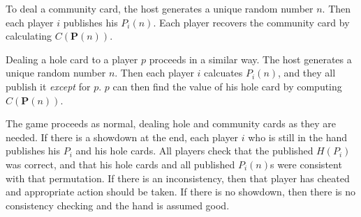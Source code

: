 \documentclass[12pt]{article}
\begin{document}
To deal a community card, the host generates a unique random number $n$.
Then each player $i$ publishes his $P_i(n)$.  Each player recovers
the community card by calculating $C(\textbf{P}(n))$.

Dealing a hole card to a player $p$ proceeds in a similar way.  The host
generates a unique random number $n$.  Then each player $i$ calcuates
$P_i(n)$, and they all publish it \textit{except} for $p$.  $p$ can then
find the value of his hole card by computing $C(\textbf{P}(n))$.

The game proceeds as normal, dealing hole and community cards as they
are needed.  If there is a showdown at the end, each player $i$ who is
still in the hand publishes his $P_i$ and his hole cards.  All players
check that the published $H(P_i)$ was correct, and that his hole cards
and all published $P_i(n)$s were consistent with that permutation.  If
there is an inconsistency, then that player has cheated and appropriate
action should be taken.  If there is no showdown, then there is no
consistency checking and the hand is assumed good.
\end{document}
